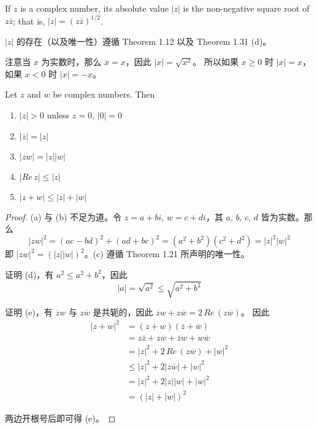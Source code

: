 \documentclass[../poma-notes.tex]{subfiles}
\begin{document}
\begin{definition}
  If $z$ is a complex number, its absolute value $|z|$ is the non-negative square root of $z\overline{z}$;
  that is, $|z| = (z\overline{z})^{1/2}$.
\end{definition}

$|z|$ 的存在（以及唯一性）遵循 Theorem 1.12 以及 Theorem 1.31 (d)。

注意当 $x$ 为实数时，那么 $\overline{x} = x$，因此 $|x| = \sqrt{x^2}$。
所以如果 $x \ge 0$ 时 $|x| = x$，如果 $x<0$ 时 $|x| = -x$。

\begin{theorem}
  Let $z$ and $w$ be complex numbers. Then
  \begin{enumerate}[label=(\alph*)]
    \item $|z|>0$ unless $z=0,\,|0|=0$
    \item $|\overline{z}|=|z|$
    \item $|zw|=|z||w|$
    \item $|Re \, z| \le |z|$
    \item $|z+w| \le |z|+|w|$
  \end{enumerate}
\end{theorem}

\begin{proof}
  (a) 与 (b) 不足为道。令 $z=a+bi,\,w=c+di$，其 $a,\,b,\,c,\,d$ 皆为实数。那么
  \[|zw|^2 = (ac-bd)^2 + (ad+bc)^2 = (a^2+b^2)(c^2+d^2) = |z|^2|w|^2\]
  即 $|zw|^2 = (|z||w|)^2$。(c) 遵循 Theorem 1.21 所声明的唯一性。

  证明 (d)，有 $a^2 \le a^2 + b^2$，因此
  \[|a| = \sqrt{a^2} \le \sqrt{a^2 + b^2}\]

  证明 (e)，有 $\overline{z}w$ 与 $z\overline{w}$ 是共轭的，因此 $\overline{z}w + z\overline{w} = 2\, Re\,(z\overline{w})$。
  因此
  \begin{align*}
    \mathcal |z+w|^2 & = (z+w)(\overline{z}+\overline{w})                              \\
                     & = z\overline{z} + z\overline{w} + \overline{z}w + w\overline{w} \\
                     & = |z|^2 + 2\,Re\,(z\overline{w}) + |w|^2                        \\
                     & \le |z|^2 + 2|z\overline{w}| + |w|^2                            \\
                     & = |z|^2 + 2|z||w| + |w|^2                                       \\
                     & = (|z|+|w|)^2
  \end{align*}

  两边开根号后即可得 (e)。
\end{proof}
\end{document}

